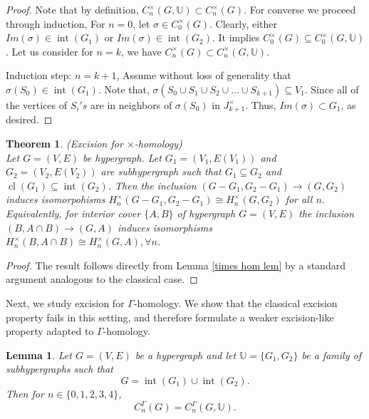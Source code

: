 \documentclass[10pt,a4paper]{amsart}
\newtheorem{thm}{Theorem}[section]
\newtheorem{lem}[subsection]{Lemma}
\newcommand{\cl}{\operatorname{cl}}
\renewcommand{\int}{\operatorname{int}}
\begin{document}
\begin{proof} Note that by definition, $C_n^\times(G,\mathbb{U}) \subset C_n^\times(G)$. For converse we proceed through induction,
For $n=0$, let $\sigma \in  C_0^\times(G)$. Clearly, either $Im(\sigma) \in \int(G_1)$ or $Im(\sigma) \in \int(G_2)$. It implies $C_0^\times(G)\subseteq C_0^\times(G,\mathbb{U})$. Let us consider for $n=k$, we have $C_n^\times(G)\subset C_n^\times(G,\mathbb{U})$.

Induction step: $n=k+1$, Assume without loss of generality that $\sigma(S_0) \in \int(G_1).$ Note that,  $\sigma(S_0 \cup S_1 \cup S_2 \cup\ldots \cup S_{k+1}) \subseteq V_1.$ Since all of the vertices of $S_i's$ are in neighbors of $\sigma(S_0)$ in $J^\times_{k+1}$. Thus, $Im(\sigma)\subset G_1$, as desired. 
\end{proof}

\begin{thm}
(Excision for $\times$-homology)\\
Let $G=(V,E)$ be hypergraph. Let $G_1=(V_1,E(V_1))$ and $G_2=(V_2,E(V_2))$ are subhypergraph such that $G_1\subseteq G_2$ and $\cl(G_1)\subseteq \int(G_2)$. Then the inclusion $(G-G_1,G_2-G_1)\rightarrow (G,G_2)$ induces isomorpohisms $H_{n}^{\times}(G-G_1,G_2-G_1)\cong H_{n}^{\times}(G,G_2)$ for all $n$. Equivalently, for interior cover $\{A,B\}$ of hypergraph $G=(V,E)$ the inclusion $(B,A\cap B)\rightarrow (G,A)$ induces isomorphisms $H_{n}^{\times}(B,A\cap B)\cong H_{n}^{\times}(G,A), \forall n$.
\end{thm}
		\begin{proof}
The result follows directly from Lemma \ref{times hom lem} by a standard argument analogous to the classical case.
\end{proof}
\medskip

Next, we study excision for $\Gamma$-homology. We show that the classical excision property fails in this setting, and therefore formulate a weaker excision-like property adapted to $\Gamma$-homology.
\begin{lem}\label{lem:Gamma-localization}
Let $G=(V,E)$ be a hypergraph and let $\mathbb{U}=\{G_1,G_2\}$ be a family of subhypergraphs such that
\[
G = \int(G_1) \cup \int(G_2).
\]
Then for $n \in \{0,1,2,3,4\}$,
\[
C_n^\Gamma(G) = C_n^\Gamma(G,\mathbb{U}).
\]
\end{lem}
\end{document}
